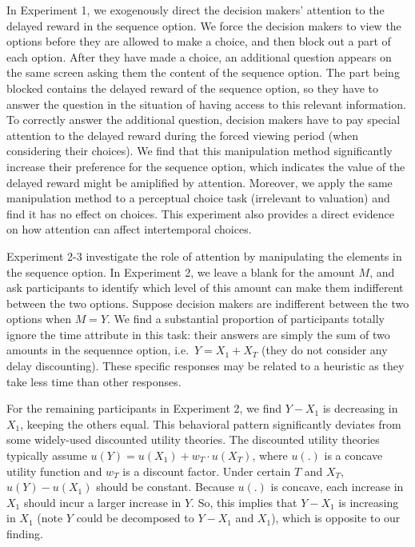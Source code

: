\documentclass[
  12pt,
]{article}
\begin{document}
In Experiment 1, we exogenously direct the decision makers' attention to
the delayed reward in the sequence option. We force the decision makers
to view the options before they are allowed to make a choice, and then
block out a part of each option. After they have made a choice, an
additional question appears on the same screen asking them the content
of the sequence option. The part being blocked contains the delayed
reward of the sequence option, so they have to answer the question in
the situation of having access to this relevant information. To
correctly answer the additional question, decision makers have to pay
special attention to the delayed reward during the forced viewing period
(when considering their choices). We find that this manipulation method
significantly increase their preference for the sequence option, which
indicates the value of the delayed reward might be amiplified by
attention. Moreover, we apply the same manipulation method to a
perceptual choice task (irrelevant to valuation) and find it has no
effect on choices. This experiment also provides a direct evidence on
how attention can affect intertemporal choices.

Experiment 2-3 investigate the role of attention by manipulating the
elements in the sequence option. In Experiment 2, we leave a blank for
the amount \(M\), and ask participants to identify which level of this
amount can make them indifferent between the two options. Suppose
decision makers are indifferent between the two options when \(M=Y\). We
find a substantial proportion of participants totally ignore the time
attribute in this task: their answers are simply the sum of two amounts
in the sequennce option, i.e.~\(Y=X_1+X_T\) (they do not consider any
delay discounting). These specific responses may be related to a
heuristic as they take less time than other responses.

For the remaining participants in Experiment 2, we find \(Y-X_1\) is
decreasing in \(X_1\), keeping the others equal. This behavioral pattern
significantly deviates from some widely-used discounted utility
theories. The discounted utility theories typically assume
\(u(Y)=u(X_1)+w_T\cdot u(X_T)\), where \(u(.)\) is a concave utility
function and \(w_T\) is a discount factor. Under certain \(T\) and
\(X_T\), \(u(Y)-u(X_1)\) should be constant. Because \(u(.)\) is
concave, each increase in \(X_1\) should incur a larger increase in
\(Y\). So, this implies that \(Y - X_1\) is increasing in \(X_1\) (note
\(Y\) could be decomposed to \(Y-X_1\) and \(X_1\)), which is opposite
to our finding.
\end{document}
